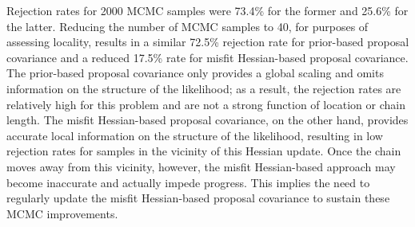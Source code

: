 Rejection rates for 2000 MCMC samples were 73.4\% for the former and
25.6\% for the latter.  Reducing the number of MCMC samples to 40, for
purposes of assessing locality, results in a similar 72.5\% rejection
rate for prior-based proposal covariance and a reduced 17.5\% rate for
misfit Hessian-based proposal covariance.  The prior-based proposal
covariance only provides a global scaling and omits information on the
structure of the likelihood; as a result, the rejection rates are
relatively high for this problem and are not a strong function of
location or chain length.  The misfit Hessian-based proposal
covariance, on the other hand, provides accurate local information on
the structure of the likelihood, resulting in low rejection rates for
samples in the vicinity of this Hessian update.  Once the chain moves
away from this vicinity, however, the misfit Hessian-based approach
may become inaccurate and actually impede progress. This implies the
need to regularly update the misfit Hessian-based proposal covariance
to sustain these MCMC improvements.

